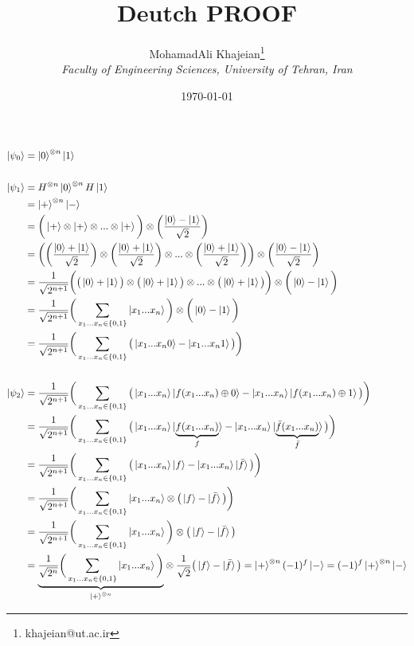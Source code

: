 \documentclass{article}
\title{\textbf{Deutch PROOF}}
\author{
    MohamadAli Khajeian\footnote{khajeian@ut.ac.ir} \\ 
    \small \textit{Faculty of Engineering Sciences, University of Tehran, Iran} \\ 
}
\date{\today}
\begin{document}
\maketitle
\begin{align*}
   \ket{\psi_{0}} &= \ket{0}^{\otimes n} \ket{1} \\ \\
   \ket{\psi_{1}} &= H^{\otimes n}\ket{0}^{\otimes n} H\ket{1} \\
   &= \ket{+}^{\otimes n} \ket{-} \\&= \bigg(\ket{+}\otimes\ket{+}\otimes...\otimes\ket{+}\bigg)\otimes\bigg(\frac{\ket{0}-\ket{1}}{\sqrt{2}}\bigg) \\
   &=  \bigg(\bigg(\frac{\ket{0}+\ket{1}}{\sqrt{2}}\bigg)\otimes\bigg(\frac{\ket{0}+\ket{1}}{\sqrt{2}}\bigg)\otimes...\otimes\bigg(\frac{\ket{0}+\ket{1}}{\sqrt{2}}\bigg)\bigg)\otimes\bigg(\frac{\ket{0}-\ket{1}}{\sqrt{2}}\bigg) \\
   &=  \frac{1}{\sqrt{2^{n+1}}}\bigg(\big(\ket{0}+\ket{1}\big)\otimes\big(\ket{0}+\ket{1}\big)\otimes...\otimes\big(\ket{0}+\ket{1}\big)\bigg)\otimes\bigg(\ket{0}-\ket{1}\bigg) \\
   &=  \frac{1}{\sqrt{2^{n+1}}}\bigg(\sum_{x_{1}...x_{n} \in \{0,1\}} \ket{x_{1}...x_{n}} \bigg)\otimes\bigg(\ket{0}-\ket{1}\bigg) \\
   &=  \frac{1}{\sqrt{2^{n+1}}}\bigg(\sum_{x_{1}...x_{n} \in \{0,1\}} \big( \ket{x_{1}...x_{n}0} - \ket{x_{1}...x_{n}1} \big) \bigg) \\ \\
   \ket{\psi_{2}} &= \frac{1}{\sqrt{2^{n+1}}}\bigg(\sum_{x_{1}...x_{n} \in \{0,1\}} \big( \ket{x_{1}...x_{n}}\ket{f(x_{1}...x_{n})\oplus0} - \ket{x_{1}...x_{n}}\ket{f(x_{1}...x_{n})\oplus1} \big) \bigg) \\
   &= \frac{1}{\sqrt{2^{n+1}}}\bigg(\sum_{x_{1}...x_{n} \in \{0,1\}} \big( \ket{x_{1}...x_{n}}\ket{\underset{f}{\underbrace{f(x_{1}...x_{n})}}} - \ket{x_{1}...x_{n}}\ket{\underset{\bar{f}}{\underbrace{\bar{f}(x_{1}...x_{n})}}} \big) \bigg) \\
   &= \frac{1}{\sqrt{2^{n+1}}}\bigg(\sum_{x_{1}...x_{n} \in \{0,1\}} \big( \ket{x_{1}...x_{n}}\ket{f} - \ket{x_{1}...x_{n}}\ket{\bar{f}} \big) \bigg) \\
   &= \frac{1}{\sqrt{2^{n+1}}}\bigg(\sum_{x_{1}...x_{n} \in \{0,1\}} \ket{x_{1}...x_{n}}\otimes\big(\ket{f}-\ket{\bar{f}}\big) \bigg) \\
   &= \frac{1}{\sqrt{2^{n+1}}}\bigg(\sum_{x_{1}...x_{n} \in \{0,1\}} \ket{x_{1}...x_{n}}\bigg) \otimes\big(\ket{f}-\ket{\bar{f}}\big) \\
   &= \underset{\ket{+}^{\otimes n}}{\underbrace{\frac{1}{\sqrt{2^{n}}}\bigg(\sum_{x_{1}...x_{n} \in \{0,1\}} \ket{x_{1}...x_{n}}\bigg)}} \otimes \frac{1}{\sqrt{2}} \big(\ket{f}-\ket{\bar{f}}\big) = \ket{+}^{\otimes n}(-1)^{f}\ket{-} = (-1)^{f}\ket{+}^{\otimes n}\ket{-}
\end{align*}
\end{document}
